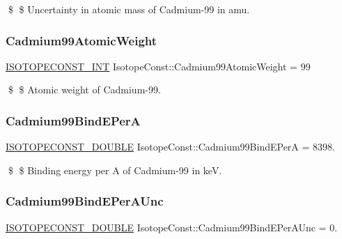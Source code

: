 \$ \$ Uncertainty in atomic mass of Cadmium-\/99 in amu. \mbox{\label{group___isotope_const-_cadmium-_cd99_gae57d9936e2651e5b116056cbb75352a9}} 
\subsubsection{\texorpdfstring{Cadmium99\+Atomic\+Weight}{Cadmium99AtomicWeight}}
{\footnotesize\ttfamily \mbox{\hyperlink{group___isotope_const-_macros_ga5f18360b3e99483a35c32d789e62621c}{I\+S\+O\+T\+O\+P\+E\+C\+O\+N\+S\+T\+\_\+\+I\+NT}} Isotope\+Const\+::\+Cadmium99\+Atomic\+Weight = 99}

\$ \$ Atomic weight of Cadmium-\/99. \mbox{\label{group___isotope_const-_cadmium-_cd99_gad08fe99711c4e5ced47b5aee730788aa}} 
\subsubsection{\texorpdfstring{Cadmium99\+Bind\+E\+PerA}{Cadmium99BindEPerA}}
{\footnotesize\ttfamily \mbox{\hyperlink{group___isotope_const-_macros_ga8f45a7272ce02c0b4c65c44636ed719a}{I\+S\+O\+T\+O\+P\+E\+C\+O\+N\+S\+T\+\_\+\+D\+O\+U\+B\+LE}} Isotope\+Const\+::\+Cadmium99\+Bind\+E\+PerA = 8398.}

\$ \$ Binding energy per A of Cadmium-\/99 in keV. \mbox{\label{group___isotope_const-_cadmium-_cd99_ga26af7b3fb3e451da19d4f6e93d6225b4}} 
\subsubsection{\texorpdfstring{Cadmium99\+Bind\+E\+Per\+A\+Unc}{Cadmium99BindEPerAUnc}}
{\footnotesize\ttfamily \mbox{\hyperlink{group___isotope_const-_macros_ga8f45a7272ce02c0b4c65c44636ed719a}{I\+S\+O\+T\+O\+P\+E\+C\+O\+N\+S\+T\+\_\+\+D\+O\+U\+B\+LE}} Isotope\+Const\+::\+Cadmium99\+Bind\+E\+Per\+A\+Unc = 0.}


